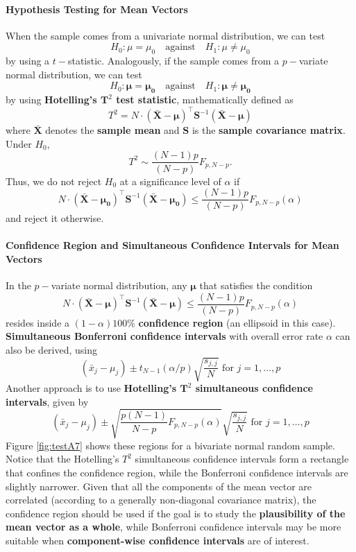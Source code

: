 \paragraph{Hypothesis Testing for Mean Vectors}
When the sample comes from a univariate normal distribution, we can test $$H_{0}: \mu=\mu_{0}\quad\mbox{against}\quad H_{1}: \mu \neq \mu_{0}$$ by using a $t-$statistic. Analogously, if the sample comes from a $p-$variate normal distribution, we can test $$H_{0}: \bm{\mu}=\bm{\mu_{0}}\quad\mbox{against}\quad H_{1}: \bm{\mu} \neq \bm{\mu_{0}}$$ by using \textbf{Hotelling's $\bm{T}^2$ test statistic}, mathematically  defined as
\begin{equation*}
    T^{2}=N\cdot (\bm{\bar{X}}-\bm{\mu})^{\!\top}\bm{S}^{-1}(\bm{\bar{X}}-\bm{\mu})
\end{equation*}
where $\bm{\bar{X}}$ denotes the \textbf{sample mean} and $\bm{S}$ is the \textbf{sample covariance matrix}.
Under $H_{0}$, $$T^{2}\sim \frac{(N-1)p}{(N-p)}F_{p, N-p}.$$ Thus, we do not reject $H_{0}$ at a significance level of $\alpha$ if 
\begin{equation}\label{eq:T2}
    N\cdot (\bm{\bar{X}}-\bm{\mu_{0}})^{\!\top}\bm{S}^{-1}(\bm{\bar{X}}-\bm{\mu_{0}}) \leq \frac{(N-1)p}{(N-p)}F_{p, N-p}(\alpha)
\end{equation}
and reject it otherwise.
\paragraph{Confidence Region and Simultaneous Confidence Intervals for Mean Vectors}
In the $p-$variate normal distribution, any $\bm{\mu}$ that satisfies the condition
\begin{equation}\label{eq:T2.2}
    N\cdot (\bm{\bar{X}}-\bm{\mu})^{\!\top}\bm{S}^{-1}(\bm{\bar{X}}-\bm{\mu}) \leq \frac{(N-1)p}{(N-p)}F_{p, N-p}(\alpha)
\end{equation}
resides inside a $(1-\alpha)100\%$ \textbf{confidence region} (an ellipsoid in this case). \textbf{Simultaneous Bonferroni confidence intervals} with overall error rate $\alpha$ can also be derived, using 
\begin{equation*}
    (\bar{x}_{j}-\mu_{j})\pm t_{N-1}(\alpha/p)\sqrt{\frac{s_{j,j}}{N}} \text{ for $j=1,\ldots, p$}
\end{equation*}
\newpage\noindent Another approach is to use \textbf{Hotelling's $\bm{T}^2$ simultaneous confidence intervals}, given by 
\begin{equation*}
    (\bar{x}_{j}-\mu_{j})\pm \sqrt{\frac{p(N-1)}{N-p}F_{p,N-p}(\alpha)} \sqrt{\frac{s_{j,j}}{N}} \text{ for $j=1,\ldots, p$}
\end{equation*}
Figure \ref{fig:testA7} shows these regions for a bivariate normal random sample. Notice that the Hotelling's ${T}^{2}$ simultaneous confidence intervals form a rectangle that confines the confidence region, while the Bonferroni confidence intervals are slightly narrower. Given that all the components of the mean vector are correlated (according to a generally non-diagonal covariance matrix), the confidence region should be used if the goal is to study the \textbf{plausibility of the mean vector as a whole}, while Bonferroni confidence intervals may be more suitable when \textbf{component-wise confidence intervals} are of interest. 

